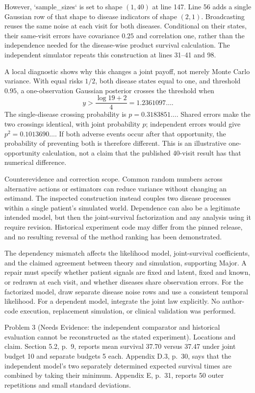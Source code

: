 \documentclass[10pt]{article}
\begin{document}
However, `sample\_sizes` is set to shape \((1,40)\) at line 147. Line 56 adds a single Gaussian row of that shape to disease indicators of shape \((2,1)\). Broadcasting reuses the same noise at each visit for both diseases. Conditional on their states, their same-visit errors have covariance \(0.25\) and correlation one, rather than the independence needed for the disease-wise product survival calculation. The independent simulator repeats this construction at lines 31–41 and 98.\par
A local diagnostic shows why this changes a joint payoff, not merely Monte Carlo variance. With equal risks \(1/2\), both disease states equal to one, and threshold \(0.95\), a one-observation Gaussian posterior crosses the threshold when \[y>\frac{\log 19+2}{4}=1.2361097\ldots .\] The single-disease crossing probability is \(p=0.3183851\ldots\). Shared errors make the two crossings identical, with joint probability \(p\); independent errors would give \(p^2=0.1013690\ldots\). If both adverse events occur after that opportunity, the probability of preventing both is therefore different. This is an illustrative one-opportunity calculation, not a claim that the published 40-visit result has that numerical difference.\par
Counterevidence and correction scope. Common random numbers across alternative actions or estimators can reduce variance without changing an estimand. The inspected construction instead couples two disease processes within a single patient’s simulated world. Dependence can also be a legitimate intended model, but then the joint-survival factorization and any analysis using it require revision. Historical experiment code may differ from the pinned release, and no resulting reversal of the method ranking has been demonstrated.\par
The dependency mismatch affects the likelihood model, joint-survival coefficients, and the claimed agreement between theory and simulation, supporting Major. A repair must specify whether patient signals are fixed and latent, fixed and known, or redrawn at each visit, and whether diseases share observation errors. For the factorized model, draw separate disease noise rows and use a consistent temporal likelihood. For a dependent model, integrate the joint law explicitly. No author-code execution, replacement simulation, or clinical validation was performed.\par
Problem 3 (Needs Evidence: the independent comparator and historical evaluation cannot be reconstructed as the stated experiment).  Locations and claim. Section 5.2, p. 9, reports mean survival 37.70 versus 37.47 under joint budget 10 and separate budgets 5 each. Appendix D.3, p. 30, says that the independent model’s two separately determined expected survival times are combined by taking their minimum. Appendix E, p. 31, reports 50 outer repetitions and small standard deviations.\par
\end{document}

